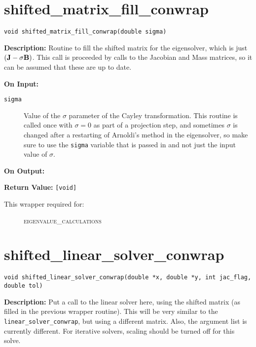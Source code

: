 \section{shifted\_matrix\_fill\_conwrap}

\texttt{void shifted\_matrix\_fill\_conwrap(double sigma)}

{\bf Description:} Routine to fill the shifted matrix for the eigensolver,
which is just $({\bf J} - \sigma {\bf B})$. This call is proceeded by calls to
the Jacobian and Mass matrices, so it can be assumed that these are up to date.

{\bf On Input:}
\begin{description}
\item[\texttt{sigma}] Value of the $\sigma$ parameter of the Cayley transformation. This routine is called once with $\sigma=0$ as part of a projection step, and sometimes $\sigma$ is changed after a restarting of Arnoldi's method in the eigensolver, so make sure to use the \texttt{sigma} variable that is passed in and not just the input value of $\sigma$.
\end{description}

{\bf On Output:}

{\bf Return Value:} \texttt{[void]} 

\begin{description}
\item[This wrapper required for:]
\textsc{eigenvalue\_calculations}
\end{description}

\section{shifted\_linear\_solver\_conwrap}

\texttt{void shifted\_linear\_solver\_conwrap(double *x, double *y,
                                         int jac\_flag, double tol)}
                                         
{\bf Description:} Put a call to the linear solver here, using the shifted matrix (as filled in the previous wrapper routine). This will be very similar to the \texttt{linear\_solver\_conwrap}, but using a different matrix. Also, the argument list is currently different. For iterative solvers, scaling should be turned off for this solve. 

